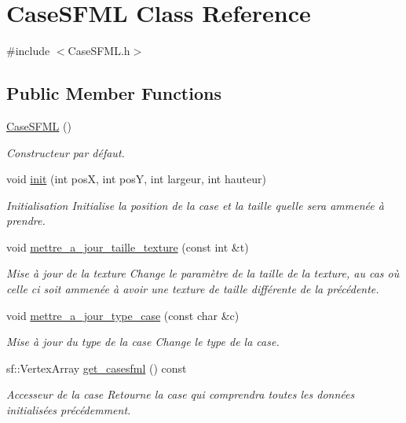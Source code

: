 \hypertarget{classCaseSFML}{}\section{Case\+S\+F\+ML Class Reference}
\label{classCaseSFML}


{\ttfamily \#include $<$Case\+S\+F\+M\+L.\+h$>$}

\subsection*{Public Member Functions}
\begin{DoxyCompactItemize}
\item 
\hyperlink{classCaseSFML_acab03b1ec1b8adcf2e5c8b7e31de3a9a}{Case\+S\+F\+ML} ()
\begin{DoxyCompactList}\small\item\em Constructeur par défaut. \end{DoxyCompactList}\item 
void \hyperlink{classCaseSFML_ae851a25113bae34b39049a3b09afd471}{init} (int posX, int posY, int largeur, int hauteur)
\begin{DoxyCompactList}\small\item\em Initialisation Initialise la position de la case et la taille qu\textquotesingle{}elle sera ammenée à prendre. \end{DoxyCompactList}\item 
void \hyperlink{classCaseSFML_ab99bde20ef9f4afcf09603701d518246}{mettre\+\_\+a\+\_\+jour\+\_\+taille\+\_\+texture} (const int \&t)
\begin{DoxyCompactList}\small\item\em Mise à jour de la texture Change le paramètre de la taille de la texture, au cas où celle ci soit ammenée à avoir une texture de taille différente de la précédente. \end{DoxyCompactList}\item 
void \hyperlink{classCaseSFML_aa2f1966e2fe57cc62f2c9642066bb554}{mettre\+\_\+a\+\_\+jour\+\_\+type\+\_\+case} (const char \&c)
\begin{DoxyCompactList}\small\item\em Mise à jour du type de la case Change le type de la case. \end{DoxyCompactList}\item 
sf\+::\+Vertex\+Array \hyperlink{classCaseSFML_ab9497e87b7eeceec1c65f61a882ec3f4}{get\+\_\+casesfml} () const 
\begin{DoxyCompactList}\small\item\em Accesseur de la case Retourne la case qui comprendra toutes les données initialisées précédemment. \end{DoxyCompactList}\item 

\end{DoxyCompactItemize}
